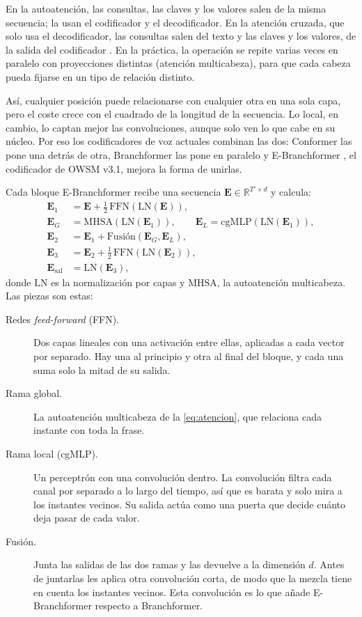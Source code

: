 En la autoatención, las consultas, las claves y los valores salen de la misma secuencia; la usan el codificador y el decodificador. En la atención cruzada, que solo usa el decodificador, las consultas salen del texto y las claves y los valores, de la salida del codificador \cite{vaswani2017attention}. En la práctica, la operación se repite varias veces en paralelo con proyecciones distintas (atención multicabeza), para que cada cabeza pueda fijarse en un tipo de relación distinto.

Así, cualquier posición puede relacionarse con cualquier otra en una sola capa, pero el coste crece con el cuadrado de la longitud de la secuencia. Lo local, en cambio, lo captan mejor las convoluciones, aunque solo ven lo que cabe en su núcleo. Por eso los codificadores de voz actuales combinan las dos: Conformer \cite{gulati2020conformer} las pone una detrás de otra, Branchformer \cite{peng2022branchformer} las pone en paralelo y E-Branchformer \cite{kim2023ebranchformer}, el codificador de OWSM v3.1, mejora la forma de unirlas.

Cada bloque E-Branchformer recibe una secuencia $\mathbf{E} \in \mathbb{R}^{T' \times d}$ y calcula:
\begin{align}
  \mathbf{E}_1 &= \mathbf{E} + \tfrac{1}{2}\,\mathrm{FFN}(\mathrm{LN}(\mathbf{E})), \\
  \mathbf{E}_G &= \mathrm{MHSA}(\mathrm{LN}(\mathbf{E}_1)), \qquad \mathbf{E}_L = \mathrm{cgMLP}(\mathrm{LN}(\mathbf{E}_1)), \\
  \mathbf{E}_2 &= \mathbf{E}_1 + \text{Fusión}(\mathbf{E}_G, \mathbf{E}_L), \\
  \mathbf{E}_3 &= \mathbf{E}_2 + \tfrac{1}{2}\,\mathrm{FFN}(\mathrm{LN}(\mathbf{E}_2)), \\
  \mathbf{E}_{\mathrm{sal}} &= \mathrm{LN}(\mathbf{E}_3),
\end{align}
donde $\mathrm{LN}$ es la normalización por capas y $\mathrm{MHSA}$, la autoatención multicabeza. Las piezas son estas:

\begin{description}
  \item[Redes \textit{feed-forward} (FFN).] Dos capas lineales con una activación entre ellas, aplicadas a cada vector por separado. Hay una al principio y otra al final del bloque, y cada una suma solo la mitad de su salida.
  \item[Rama global.] La autoatención multicabeza de la \cref{eq:atencion}, que relaciona cada instante con toda la frase.
  \item[Rama local (cgMLP).] Un perceptrón con una convolución dentro. La convolución filtra cada canal por separado a lo largo del tiempo, así que es barata y solo mira a los instantes vecinos. Su salida actúa como una puerta que decide cuánto deja pasar de cada valor.
  \item[Fusión.] Junta las salidas de las dos ramas y las devuelve a la dimensión $d$. Antes de juntarlas les aplica otra convolución corta, de modo que la mezcla tiene en cuenta los instantes vecinos. Esta convolución es lo que añade E-Branchformer respecto a Branchformer.
\end{description}

